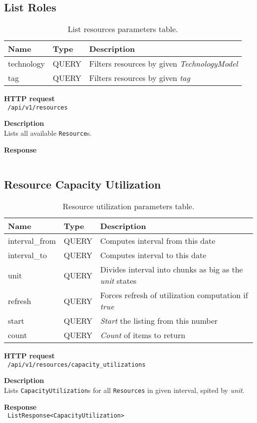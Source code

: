 \subsection{List Roles}
\begin{table}[ht!]
    \begin{tabularx}{\textwidth}{llX}
        \toprule
        Name & Type & Description \\
        \midrule
        technology & QUERY & Filters resources by given \emph{TechnologyModel} \\  
        tag & QUERY & Filters resources by given \emph{tag}
        \end{tabularx}
    \caption{List resources parameters table.}
\end{table}
\begin{description}
    \item \textbf{HTTP request}\\
        \texttt{\text{[GET]} /api/v1/resources}
    \item \textbf{Description}\\
        Lists all available \texttt{Resource}s.
    \item \textbf{Response}\\
        \texttt{\text{[200 OK]} \text{[Resource]}}
\end{description}
\subsection{Resource Capacity Utilization}
\begin{table}[ht!]
    \begin{tabularx}{\textwidth}{llX}
        \toprule
        Name & Type & Description \\
        \midrule
        interval\_from & QUERY & Computes interval from this date \\  
        interval\_to & QUERY & Computes interval to this date \\
        unit & QUERY & Divides interval into chunks as big as the \emph{unit} states \\
        refresh & QUERY & Forces refresh of utilization computation if \emph{true} \\
        start & QUERY & \emph{Start} the listing from this number \\  
        count & QUERY & \emph{Count} of items to return
        \end{tabularx}
    \caption{Resource utilization parameters table.}
\end{table}
\begin{description}
    \item \textbf{HTTP request}\\
        \texttt{\text{[GET]} /api/v1/resources/capacity\_utilizations}
    \item \textbf{Description}\\
        Lists \texttt{CapacityUtilization}s for all \texttt{Resources} in given interval, spited by \emph{unit}.
    \item \textbf{Response}\\
        \texttt{\text{[200 OK]} ListResponse<CapacityUtilization>}
\end{description}


